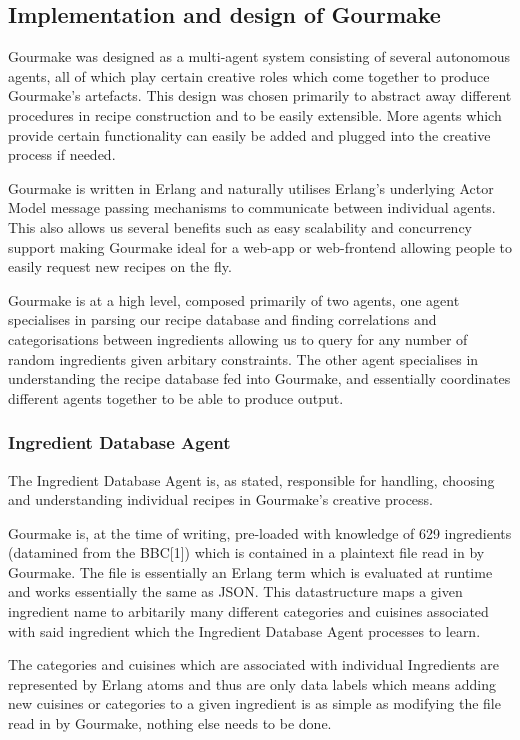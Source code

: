 \documentclass[9pt,titlepage,a4paper]{extarticle}
\begin{document}
\subsection{Implementation and design of Gourmake}
    Gourmake was designed as a multi-agent system consisting of several autonomous agents, all of which
    play certain creative roles which come together to produce Gourmake's artefacts. This design was chosen
    primarily to abstract away different procedures in recipe construction and to be easily extensible.
    More agents which provide certain functionality can easily be added and plugged into the creative process
    if needed.

    Gourmake is written in Erlang and naturally utilises Erlang's underlying Actor Model message passing mechanisms to communicate between
    individual agents. This also allows us several benefits such as easy scalability and concurrency support
    making Gourmake ideal for a web-app or web-frontend allowing people to easily request new recipes on the fly.

    Gourmake is at a high level, composed primarily of two agents, one agent specialises in parsing our
    recipe database and finding correlations and categorisations between ingredients allowing us to query
    for any number of random ingredients given arbitary constraints. The other agent specialises in
    understanding the recipe database fed into Gourmake, and essentially coordinates different agents together
    to be able to produce output.

\subsubsection{Ingredient Database Agent}
    The Ingredient Database Agent is, as stated, responsible for handling, choosing and understanding individual
    recipes in Gourmake's creative process. 
    
    Gourmake is, at the time of writing, pre-loaded with knowledge of 629 ingredients (datamined from the BBC[1]) which is 
    contained in a plaintext file read in by Gourmake. The file is essentially an Erlang term which is evaluated at 
    runtime and works essentially the same as JSON. This datastructure maps a given ingredient name to arbitarily many different
    categories and cuisines associated with said ingredient which the Ingredient Database Agent processes to
    learn.
    
    The categories and cuisines which are associated with individual Ingredients are represented by Erlang atoms
    and thus are only data labels which means adding new cuisines or categories to a given ingredient is as simple
    as modifying the file read in by Gourmake, nothing else needs to be done.
\end{document}
